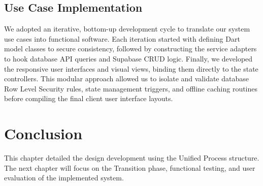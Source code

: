 \subsection{Use Case Implementation}
We adopted an iterative, bottom-up development cycle to translate our system use cases into functional software. Each iteration started with defining Dart model classes to secure consistency, followed by constructing the service adapters to hook database API queries and Supabase CRUD logic. Finally, we developed the responsive user interfaces and visual views, binding them directly to the state controllers. This modular approach allowed us to isolate and validate database Row Level Security rules, state management triggers, and offline caching routines before compiling the final client user interface layouts.

\section{Conclusion}
This chapter detailed the design development using the Unified Process structure. The next chapter will focus on the Transition phase, functional testing, and user evaluation of the implemented system.
